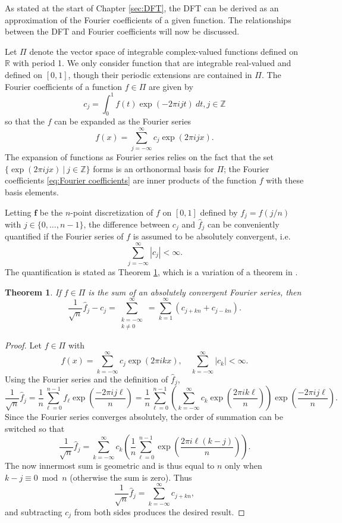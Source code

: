 \documentclass[12pt]{book}
\newtheorem{theorem}{Theorem}[section]
\begin{document}
As stated at the start of Chapter \ref{sec:DFT}, the DFT can be derived as an approximation of the Fourier coefficients of a given function. The relationships between the DFT and Fourier coefficients will now be discussed. \par 
Let $\Pi$ denote the vector space of integrable complex-valued functions defined on $\mathbb{R}$ with period 1. We only consider function that are integrable real-valued and defined on $[0,1]$, though their periodic extensions are contained in $\Pi$.  The Fourier coefficients of a function $f \in \Pi$ are given by 
\begin{equation}
\label{eq:Fourier coefficients}
c_j = \int_0^1 f(t)\exp(-2\pi{i}jt) \: dt, j \in \mathbb{Z}
\end{equation}
so that the $f$ can be expanded as the Fourier series
\begin{equation}
\label{eq:Fourier series}
f(x) = \sum_{j=-\infty}^{\infty} c_j \exp(2\pi{i}jx).
\end{equation}
The expansion of functions as Fourier series relies on the fact that the set $\{\exp(2\pi{i}jx)\:|\:j\in\mathbb{Z}\}$ forms is an orthonormal basis for $\Pi$; the Fourier coefficients \eqref{eq:Fourier coefficients} are inner products of the function $f$ with these basis elements. \par
Letting $\mathbf{f}$ be the $n$-point discretization of $f$ on $[0,1]$ defined by $f_j = f(j/n)$ with $j \in \{0,\ldots,n-1\}$, the difference between $c_j$ and $\widehat{f}_j$ can be conveniently quantified if the Fourier series of $f$ is assumed to be absolutely convergent, i.e.
\[\sum_{j=-\infty}^{\infty} |c_j| < \infty.\]
The quantification is stated as Theorem \ref{thm:Fourier accuracy}, which is a variation of a theorem in \cite[p.~19]{Henrici3}.
\begin{theorem}
\label{thm:Fourier accuracy}
If $f \in \Pi$ is the sum of an absolutely convergent Fourier series, then
\[\frac{1}{\sqrt{n}}\widehat{f}_j - c_j = \sum_{\substack{
k = -\infty \\
k \neq 0
}}^{\infty} = \sum_{k=1}^{\infty} (c_{j+k{n}} + c_{j-k{n}}).\]
\end{theorem}
\begin{proof}
Let $f \in \Pi$ with
\[f(x) = \sum_{k=-\infty}^{\infty} c_j \exp(2\pi{i}kx), \quad \sum_{k=-\infty}^{\infty} |c_k| < \infty.\]
Using the Fourier series and the definition of $\widehat{f}_j$,
\[\frac{1}{\sqrt{n}}\widehat{f}_j = \frac{1}{n}\sum_{\ell=0}^{n-1} f_{\ell}\exp\left(\frac{-2\pi{ij\ell}}{n}\right) = \frac{1}{n} \sum_{\ell=0}^{n-1} \left(\sum_{k=-\infty}^{\infty} c_k \exp\left(\frac{2\pi{i}k\ell}{n}\right)\right)\exp\left(\frac{-2\pi{ij\ell}}{n}\right).\]
Since the Fourier series converges absolutely, the order of summation can be switched so that
\[\frac{1}{\sqrt{n}}\widehat{f}_j = \sum_{k=-\infty}^{\infty} c_k \left(\frac{1}{n} \sum_{\ell=0}^{n-1} \exp\left(\frac{2\pi{i}\ell(k-j)}{n}\right)\right).\]
The now innermost sum is geometric and is thus equal to $n$ only when $k - j \equiv 0 \bmod n$ (otherwise the sum is zero). Thus
\[\frac{1}{\sqrt{n}}\widehat{f}_j = \sum_{k=-\infty}^{\infty} c_{j+kn},\]
and subtracting $c_j$ from both sides produces the desired result.
\end{proof}
\end{document}
